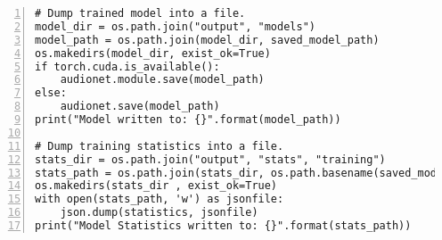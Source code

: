 {\begin{Verbatim}[frame=leftline, numbers=left, xleftmargin=5mm]
# Dump trained model into a file.
model_dir = os.path.join("output", "models")
model_path = os.path.join(model_dir, saved_model_path)
os.makedirs(model_dir, exist_ok=True)
if torch.cuda.is_available():
    audionet.module.save(model_path)
else:
    audionet.save(model_path)
print("Model written to: {}".format(model_path))

# Dump training statistics into a file.
stats_dir = os.path.join("output", "stats", "training")
stats_path = os.path.join(stats_dir, os.path.basename(saved_model_path) + ".stats.json")
os.makedirs(stats_dir , exist_ok=True)
with open(stats_path, 'w') as jsonfile:
    json.dump(statistics, jsonfile)
print("Model Statistics written to: {}".format(stats_path))
\end{Verbatim}
}
